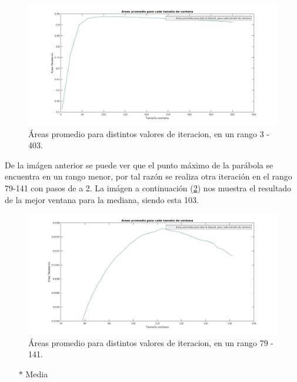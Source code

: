 \begin{figure}[H]
	{
	\centering
	\includegraphics[width=1\textwidth]{Figures/MedianaRangoGrandeHRF}
	\caption[Mediana HRF]{\'Areas promedio para distintos valores de iteracion, en un rango 3 - 403.}
	\label{fig:MedianaRangoGrandeHRF}
	}
\end{figure}


De la im\'agen anterior se puede ver que el punto m\'aximo de la par\'abola se encuentra en un rango menor, por tal raz\'on se realiza otra iteraci\'on en el rango 79-141 con pasos de a 2. La im\'agen a continuaci\'on (\ref{fig:MedianaRangoChicoHRF}) nos muestra el resultado de la mejor ventana para la mediana, siendo esta 103.\\


\begin{figure}[H]
	{
	\centering
	\includegraphics[width=1\textwidth]{Figures/MedianaRangoChicoHRF}
	\caption[Mediana HRF]{\'Areas promedio para distintos valores de iteracion, en un rango 79 - 141.}
	\label{fig:MedianaRangoChicoHRF}
	}
\end{figure}



\begin{itemize}
	\item[$*$]Media
\end{itemize}

